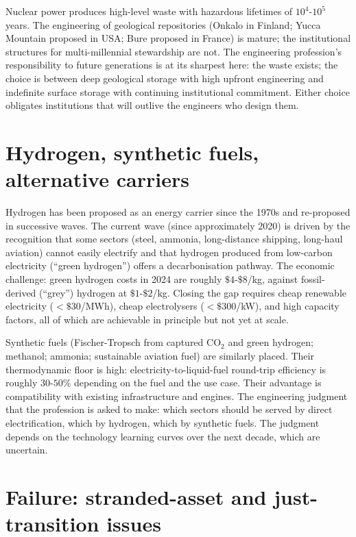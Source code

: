 \begin{archetype}
Nuclear power produces high-level waste with hazardous lifetimes of $10^4$-$10^5$ years. The engineering of geological repositories (Onkalo in Finland; Yucca Mountain proposed in USA; Bure proposed in France) is mature; the institutional structures for multi-millennial stewardship are not. The engineering profession's responsibility to future generations is at its sharpest here: the waste exists; the choice is between deep geological storage with high upfront engineering and indefinite surface storage with continuing institutional commitment. Either choice obligates institutions that will outlive the engineers who design them.
\end{archetype}

\section{Hydrogen, synthetic fuels, alternative carriers}

Hydrogen has been proposed as an energy carrier since the 1970s and re-proposed in successive waves. The current wave (since approximately 2020) is driven by the recognition that some sectors (steel, ammonia, long-distance shipping, long-haul aviation) cannot easily electrify and that hydrogen produced from low-carbon electricity (``green hydrogen'') offers a decarbonisation pathway. The economic challenge: green hydrogen costs in 2024 are roughly $\$4$-$\$8$/kg, against fossil-derived (``grey'') hydrogen at $\$1$-$\$2$/kg. Closing the gap requires cheap renewable electricity ($<\$30$/MWh), cheap electrolysers ($<\$300$/kW), and high capacity factors, all of which are achievable in principle but not yet at scale.

Synthetic fuels (Fischer-Tropsch from captured CO$_2$ and green hydrogen; methanol; ammonia; sustainable aviation fuel) are similarly placed. Their thermodynamic floor is high: electricity-to-liquid-fuel round-trip efficiency is roughly $30$-$50\%$ depending on the fuel and the use case. Their advantage is compatibility with existing infrastructure and engines. The engineering judgment that the profession is asked to make: which sectors should be served by direct electrification, which by hydrogen, which by synthetic fuels. The judgment depends on the technology learning curves over the next decade, which are uncertain.

\section{Failure: stranded-asset and just-transition issues}

